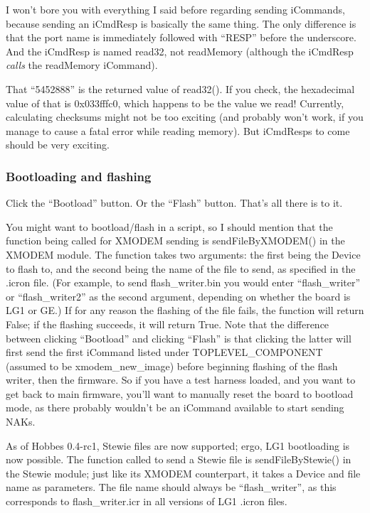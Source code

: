I won't bore you with everything I said before regarding sending iCommands, because sending an iCmdResp is basically the same thing. The only difference is that the port name is immediately followed with ``RESP'' before the underscore. And the iCmdResp is named read32, not readMemory (although the iCmdResp \emph{calls} the readMemory iCommand).

That ``5452888'' is the returned value of read32(). If you check, the hexadecimal value of that is 0x033fffc0, which happens to be the value we read! Currently, calculating checksums might not be too exciting (and probably won't work, if you manage to cause a fatal error while reading memory). But iCmdResps to come should be very exciting.



%
%
\subsubsection{Bootloading and flashing}
\label{3.2.7}

Click the ``Bootload'' button. Or the ``Flash'' button. That's all there is to it.

You might want to bootload/flash in a script, so I should mention that the function being called for XMODEM sending is sendFileByXMODEM() in the XMODEM module. The function takes two arguments: the first being the Device to flash to, and the second being the name of the file to send, as specified in the .icron file. (For example, to send flash\_writer.bin you would enter ``flash\_writer'' or ``flash\_writer2'' as the second argument, depending on whether the board is LG1 or GE.) If for any reason the flashing of the file fails, the function will return False; if the flashing succeeds, it will return True. Note that the difference between clicking ``Bootload'' and clicking ``Flash'' is that clicking the latter will first send the first iCommand listed under TOPLEVEL\_COMPONENT (assumed to be xmodem\_new\_image) before beginning flashing of the flash writer, then the firmware. So if you have a test harness loaded, and you want to get back to main firmware, you'll want to manually reset the board to bootload mode, as there probably wouldn't be an iCommand available to start sending NAKs.

As of Hobbes 0.4-rc1, Stewie files are now supported; ergo, LG1 bootloading is now possible. The function called to send a Stewie file is sendFileByStewie() in the Stewie module; just like its XMODEM counterpart, it takes a Device and file name as parameters. The file name should always be ``flash\_writer'', as this corresponds to flash\_writer.icr in all versions of LG1 .icron files.


